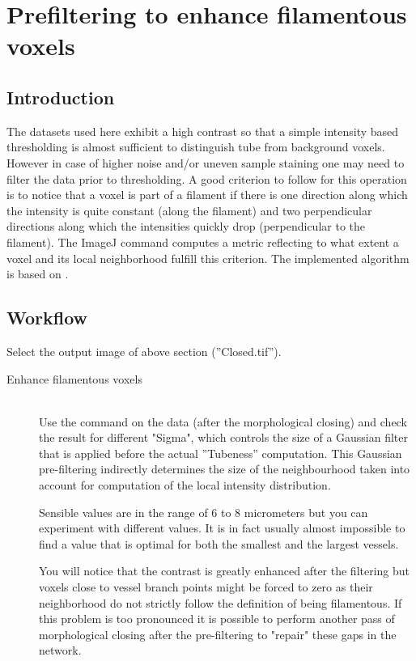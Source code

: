 \section{Prefiltering to enhance filamentous voxels}

\subsection{Introduction}
The datasets used here exhibit a high contrast so that a simple intensity based thresholding is almost sufficient to distinguish tube from background voxels. However in case of higher noise and/or uneven sample staining one may need to filter the data prior to thresholding. A good criterion to follow for this operation is to notice that a voxel is part of a filament if there is one direction along which the intensity is quite constant (along the filament) and two perpendicular directions along which the intensities quickly drop (perpendicular to the filament). The ImageJ command  computes a metric reflecting to what extent a voxel and its local neighborhood fulfill this criterion. The implemented algorithm is based on \cite{Sato1998}.

\subsection{Workflow}
Select the output image of above section (''Closed.tif'').

\begin{description}

\item[Enhance filamentous voxels]\hfill\\
Use the  command on the data (after the morphological closing) and check the result for different "Sigma", which controls the size of a Gaussian filter that is applied before the actual ''Tubeness'' computation.
This Gaussian pre-filtering indirectly determines the size of the neighbourhood taken into account for computation of the local intensity distribution.

Sensible values are in the range of 6 to 8 micrometers but you can experiment with different values. It is in fact usually almost impossible to find a value that is optimal for both the smallest and the largest vessels. 

You will notice that the contrast is greatly enhanced after the filtering but voxels close to vessel branch points might be forced to zero as their neighborhood do not strictly follow the definition of being filamentous. If this problem is too pronounced it is possible to perform another pass of morphological closing after the pre-filtering to "repair" these gaps in the network.
\end{description}

